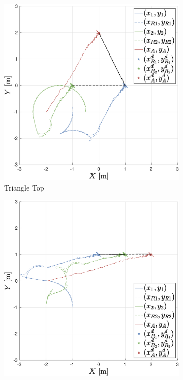 \documentclass{ifacconf}
\begin{document}
\begin{figure}
    \centering
    \begin{subfigure}[b]{0.32\columnwidth}
        \centering
        \includegraphics[width=\linewidth]{images/simulations/with_APF/noisy/1st_scenario_with_noisy.eps}
         \caption{Triangle Top}
    \end{subfigure}
    \begin{subfigure}[b]{0.32\columnwidth}
        \centering
        \includegraphics[width=\linewidth]{images/simulations/with_APF/noisy/2nd_scenario_with_noisy.eps}

\end{subfigure}
\end{figure}
\end{document}
